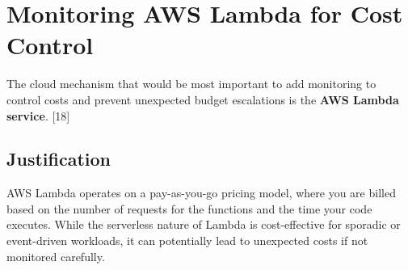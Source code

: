 
\newpage

\clearpage

\chapter{Monitoring AWS Lambda for Cost Control}
The cloud mechanism that would be most important to add monitoring to control costs and prevent unexpected budget escalations is the \textbf{AWS Lambda service}. [18]

\section{Justification} 

AWS Lambda operates on a pay-as-you-go pricing model, where you are billed based on the number of requests for the functions and the time your code executes. While the serverless nature of Lambda is cost-effective for sporadic or event-driven workloads, it can potentially lead to unexpected costs if not monitored carefully.

